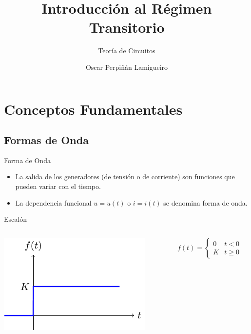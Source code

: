 \documentclass[aspectratio=169, usenames,svgnames,dvipsnames]{beamer}
\author{Oscar Perpiñán Lamigueiro}
\date{}
\title{Introducción al Régimen Transitorio}
\subtitle{Teoría de Circuitos}
\begin{document}
\maketitle


\section{Conceptos Fundamentales}
\label{sec:orge15ca02}
\subsection{Formas de Onda}
\label{sec:org612d69a}
\begin{frame}[label={sec:orgb87b687}]{Forma de Onda}
\begin{itemize}
\item La salida de los generadores (de tensión o de corriente) son funciones que pueden variar con el tiempo.
\item La dependencia funcional \(u = u(t)\) o \(i = i(t)\) se denomina forma de onda.
\end{itemize}
\end{frame}

\begin{frame}[label={sec:orgbbea2cf}]{Escalón}
\begin{columns}
\begin{column}{0.5\columnwidth}
\begin{center}
\includegraphics[width=.9\linewidth]{../figs/escalon.pdf}
\end{center}
\end{column}

\begin{column}{0.5\columnwidth}
\[
  f(t) = %
  \begin{cases}
    0 & t < 0\\
    K & t \geq 0
  \end{cases}
  \]
\end{column}
\end{columns}
\end{frame}
\end{document}

